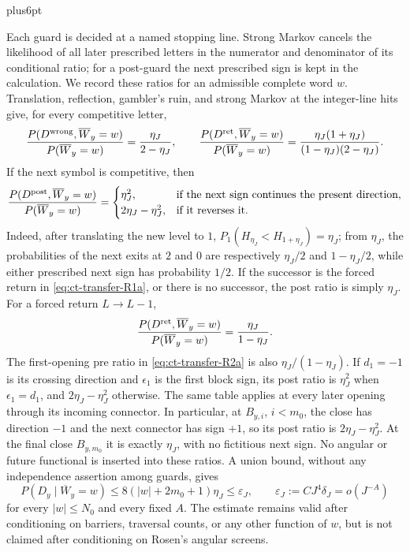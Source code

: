 \documentclass[12pt,reqno]{amsart}
\makeatletter
\theoremstyle{plain}
\theoremstyle{definition}
\theoremstyle{remark}
\renewenvironment{proof}[1][\proofname]{%
  \par
  \pushQED{\qed}%
  \normalfont
  \topsep6pt plus6pt\relax
  \trivlist
  \item[\hskip\labelsep\slshape #1\@addpunct{.}]%
  \ignorespaces
}{%
  \popQED
  \endtrivlist
  \@endpefalse
}
\DeclareRobustCommand{\qed}{%
  \leavevmode\unskip\penalty9999\hbox{}\nobreak
  \ifmmode
    \makebox[0pt][l]{\qquad\hbox{\qedsymbol}}%
  \else
    \qquad\hbox{\qedsymbol}%
  \fi
}
\renewcommand{\qedsymbol}{\rule[.47pt]{4pt}{6pt}}
\numberwithin{equation}{section}
\makeatother
\begin{document}
\begin{proof}[Proof of Lemma~\ref{lem:buffered-transfer}]
Each guard is decided at a named stopping line. Strong Markov cancels the
likelihood of all later prescribed letters in the numerator and denominator
of its conditional ratio; for a post-guard the next prescribed sign is kept
in the calculation. We record these ratios for an admissible complete word
$w$.  Translation, reflection, gambler's ruin, and strong Markov at the
integer-line hits give, for every competitive letter,
\begin{equation}
\frac{P(D^{\rm wrong},\overline W_y=w)}{P(\overline W_y=w)}
       =\frac{\eta_J}{2-\eta_J},\qquad
 \frac{P(D^{\rm ret},\overline W_y=w)}{P(\overline W_y=w)}
       =\frac{\eta_J(1+\eta_J)}
          {(1-\eta_J)(2-\eta_J)}.\label{eq:ct-transfer-R2b}
\end{equation}
If the next symbol is competitive, then
\begin{equation}
\frac{P(D^{\rm post},\overline W_y=w)}{P(\overline W_y=w)}
 =\begin{cases}
    \eta_J^2,&\text{if the next sign continues the present direction},\\
    2\eta_J-\eta_J^2,&\text{if it reverses it}.
   \end{cases}\label{eq:ct-transfer-R2c}
\end{equation}
Indeed, after translating the new level to $1$,
$P_1(H_{\eta_J}<H_{1+\eta_J})=\eta_J$; from $\eta_J$, the
probabilities of the next exits at $2$ and $0$ are respectively
$\eta_J/2$ and $1-\eta_J/2$, while either prescribed next sign has
probability $1/2$.  If the successor is the forced return in \eqref{eq:ct-transfer-R1a}, or
there is no successor, the post ratio is simply $\eta_J$.  For a forced
return $L\to L-1$,
\begin{equation}
\frac{P(D^{\rm ret},\overline W_y=w)}{P(\overline W_y=w)}
       =\frac{\eta_J}{1-\eta_J}.\label{eq:ct-transfer-R2d}
\end{equation}
The first-opening pre ratio in \eqref{eq:ct-transfer-R2a} is also
$\eta_J/(1-\eta_J)$.  If $d_1=-1$ is its crossing direction and
$\epsilon_1$ is the first block sign, its post ratio is
$\eta_J^2$ when $\epsilon_1=d_1$, and
$2\eta_J-\eta_J^2$ otherwise.  The same table applies at every later
opening through its incoming connector.  In particular, at $B_{y,i}$,
$i<m_0$, the close has direction $-1$ and the next connector has sign
$+1$, so its post ratio is $2\eta_J-\eta_J^2$.  At the final close
$B_{y,m_0}$ it is exactly $\eta_J$, with no fictitious next sign.
No angular or future functional is inserted into these ratios. A union bound, without
any independence assertion among guards, gives
\begin{equation}
P(D_y\mid\overline W_y=w)
 \le8(|w|+2m_0+1)\eta_J
 \le\varepsilon_J,
 \qquad \varepsilon_J:=CJ^4\delta_J=o(J^{-A})\label{eq:ct-transfer-R3}
\end{equation}
for every $|w|\le N_0$ and every fixed $A$.  The estimate remains
valid after conditioning on barriers, traversal counts, or any other
function of $w$, but is not claimed after conditioning on Rosen's
angular screens.


\end{proof}
\end{document}
